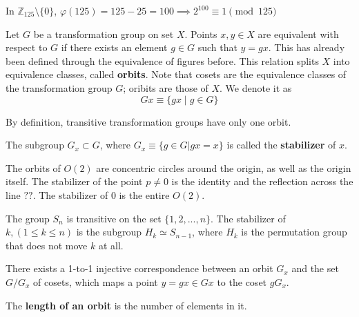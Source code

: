   \begin{example}
    In $\mathbb{Z}_{125} \setminus \{0\}$, $\varphi(125) = 125 - 25 = 100 \implies 2^{100} \equiv 1 \pmod{125}$
  \end{example}

  \begin{definition}
    Let $G$ be a transformation group on set $X$. Points $x, y \in X$ are equivalent with respect to $G$ if there exists an element $g \in G$ such that $y = g x$. This has already been defined through the equivalence of figures before. This relation splits $X$ into equivalence classes, called \textbf{orbits}. Note that cosets are the equivalence classes of the transformation group $G$; oribits are those of $X$. We denote it as
    \begin{equation}
      Gx \equiv \{ g x \;|\;g \in G \}
    \end{equation}
  \end{definition}

  By definition, transitive transformation groups have only one orbit.

  \begin{definition}
    The subgroup $G_{x} \subset G$, where $G_{x} \equiv \{ g \in G | g x = x\}$ is called the \textbf{stabilizer} of $x$.
  \end{definition}

  \begin{example}
    The orbits of $O(2)$ are concentric circles around the origin, as well as the origin itself. The stabilizer of the point $p \neq 0$ is the identity and the reflection across the line $??$. The stabilizer of $0$ is the entire $O(2)$.
  \end{example}

  \begin{example}
    The group $S_n$ is transitive on the set $\{1, 2, ..., n\}$. The stabilizer of $k, (1 \leq k \leq n)$ is the subgroup $H_{k} \simeq S_{n-1}$, where $H_k$ is the permutation group that does not move $k$ at all. 
  \end{example}

  \begin{theorem}
    There exists a 1-to-1 injective correspondence between an orbit $G_x$ and the set $G / G_{x}$ of cosets, which maps a point $y = g x \in G x $ to the coset $g G_x$. 
  \end{theorem}

  \begin{definition}
    The \textbf{length of an orbit} is the number of elements in it. 
  \end{definition}

